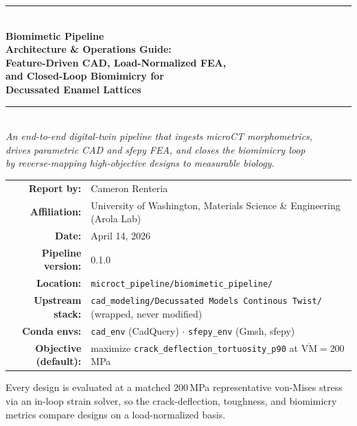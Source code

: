 \documentclass[11pt, letterpaper]{article}
\begin{document}

\begin{titlepage}
  \centering
  \vspace*{1.2cm}

  {\color{NavyBlue}\rule{\linewidth}{1.5pt}}\\[0.8em]

  {\LARGE\bfseries Biomimetic Pipeline\\[0.4em]
   Architecture \& Operations Guide:\\[0.3em]
   Feature-Driven CAD, Load-Normalized FEA,\\[0.3em]
   and Closed-Loop Biomimicry for\\[0.3em]
   Decussated Enamel Lattices}\\[0.8em]

  {\color{NavyBlue}\rule{\linewidth}{1.5pt}}\\[1.6em]

  {\large\itshape An end-to-end digital-twin pipeline that ingests microCT morphometrics,\\[0.2em]
  drives parametric CAD and sfepy FEA, and closes the biomimicry loop\\[0.2em]
  by reverse-mapping high-objective designs to measurable biology.}\\[2em]

  \begin{tabular}{rl}
    \textbf{Report by:} & Cameron Renteria \\[4pt]
    \textbf{Affiliation:} & University of Washington, Materials Science \& Engineering (Arola Lab) \\[4pt]
    \textbf{Date:}      & April 14, 2026 \\[4pt]
    \textbf{Pipeline version:} & 0.1.0 \\[4pt]
    \textbf{Location:}  & \texttt{microct\_pipeline/biomimetic\_pipeline/} \\[4pt]
    \textbf{Upstream stack:} & \texttt{cad\_modeling/Decussated Models Continous Twist/} (wrapped, never modified) \\[4pt]
    \textbf{Conda envs:} & \texttt{cad\_env} (CadQuery) $\cdot$ \texttt{sfepy\_env} (Gmsh, sfepy) \\[4pt]
    \textbf{Objective (default):} & maximize \texttt{crack\_deflection\_tortuosity\_p90} at $\overline{\mathrm{VM}} = 200$\,MPa \\
  \end{tabular}

  \vfill

  {\small Every design is evaluated at a matched 200\,MPa representative von-Mises stress via an in-loop
  strain solver, so the crack-deflection, toughness, and biomimicry metrics compare designs on a load-normalized basis.}
\end{titlepage}
\end{document}
